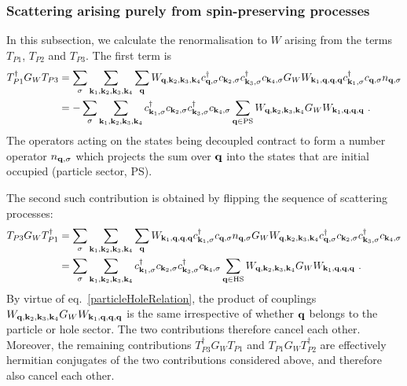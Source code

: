 \documentclass[reprint,hidelinks]{revtex4-2}
\begin{document}
\begin{widetext}
\subsubsection*{Scattering arising purely from spin-preserving processes}
In this subsection, we calculate the renormalisation to \(W\) arising from the terms \(T_{P1}\), \(T_{P2}\) and \(T_{P3}\). The first term is
\begin{equation}\begin{aligned}
	T_{P1}^\dagger G_W T_{P3} &= \sum_\sigma\sum_{{\bf k}_1, {\bf k}_2, {\bf k}_3, {\bf k}_4} \sum_{\bf q} W_{{\bf q},{\bf k}_2,{\bf k}_3,{\bf k}_4}c^\dagger_{{\bf q},\sigma}c_{{\bf k}_2,\sigma}c^\dagger_{{\bf k}_3,\sigma}c_{{\bf k}_4,\sigma} G_W W_{{\bf k}_1,{\bf q},{\bf q},{\bf q}} c^\dagger_{{\bf k}_1,\sigma}c_{{\bf q},\sigma} n_{{\bf q},\sigma}\\
							  &= -\sum_\sigma\sum_{{\bf k}_1, {\bf k}_2, {\bf k}_3, {\bf k}_4} c^\dagger_{{\bf k}_1,\sigma} c_{{\bf k}_2,\sigma}c^\dagger_{{\bf k}_3,\sigma}c_{{\bf k}_4,\sigma} \sum_{\bf q \in \text{PS}} W_{{\bf q},{\bf k}_2,{\bf k}_3,{\bf k}_4} G_W W_{{\bf k}_1,{\bf q},{\bf q},{\bf q}}~.
\end{aligned}\end{equation}
The operators acting on the states being decoupled contract to form a number operator \(n_{{\bf q},\sigma}\) which projects the sum over \({\bf q}\) into the states that are initial occupied (particle sector, PS). 

The second such contribution is obtained by flipping the sequence of scattering processes:
\begin{equation}\begin{aligned}
	T_{P3} G_W T_{P1}^\dagger &= \sum_\sigma\sum_{{\bf k}_1, {\bf k}_2, {\bf k}_3, {\bf k}_4} \sum_{\bf q} W_{{\bf k}_1,{\bf q},{\bf q},{\bf q}} c^\dagger_{{\bf k}_1,\sigma}c_{{\bf q},\sigma} n_{{\bf q},\sigma} G_W W_{{\bf q},{\bf k}_2,{\bf k}_3,{\bf k}_4}c^\dagger_{{\bf q},\sigma}c_{{\bf k}_2,\sigma}c^\dagger_{{\bf k}_3,\sigma}c_{{\bf k}_4,\sigma} \\
							  &= \sum_\sigma\sum_{{\bf k}_1, {\bf k}_2, {\bf k}_3, {\bf k}_4} c^\dagger_{{\bf k}_1,\sigma} c_{{\bf k}_2,\sigma}c^\dagger_{{\bf k}_3,\sigma}c_{{\bf k}_4,\sigma} \sum_{\bf q \in \text{HS}} W_{{\bf q},{\bf k}_2,{\bf k}_3,{\bf k}_4} G_W W_{{\bf k}_1,{\bf q},{\bf q},{\bf q}}~.
\end{aligned}\end{equation}
By virtue of eq.~\ref{particleHoleRelation}, the product of couplings \(W_{{\bf q},{\bf k}_2,{\bf k}_3,{\bf k}_4} G_W W_{{\bf k}_1,{\bf q},{\bf q},{\bf q}}\) is the same irrespective of whether \({\bf q}\) belongs to the particle or hole sector. The two contributions therefore cancel each other. Moreover, the remaining contributions \(T_{P3}^\dagger G_W T_{P1}\) and \(T_{P1}G_W T_{P2}^\dagger\) are effectively hermitian conjugates of the two contributions considered above, and therefore also cancel each other.


\end{widetext}
\end{document}
